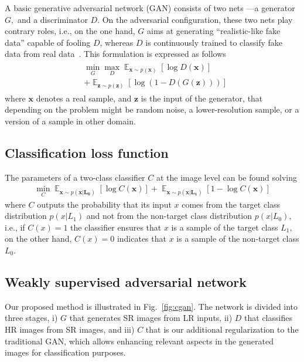 \documentclass[10pt,twocolumn,letterpaper]{article}
\DeclareMathOperator*{\E}{\mathbb{E}}
\providecommand{\ve}[1]{{\bm{#1}}} %
\begin{document}
A basic generative adversarial network (GAN) consists of two nets ---a generator $G,$ and a discriminator $D$. On the adversarial configuration, these two nets play contrary roles, i.e., on the one hand, $G$ aims at generating ``realistic-like fake data'' capable of fooling $D$, whereas $D$ is continuously trained to classify fake data from real data~\cite{Goodfellow2014}. This formulation is expressed as follows
\begin{eqnarray}
\label{eq:gan}
\begin{aligned}
& \min_G \max_D \E_{\ve{x} \sim p(\ve{x})}[\log D(\ve{x})]\\
& +\E_{\ve{z} \sim p(\ve{z})}[\log (1 - D(G(\ve{z})))]  
\end{aligned}
\end{eqnarray}
where $\ve{x}$ denotes a real sample, and $\ve{z}$ is the input of the generator, that depending on the problem might be random noise, a lower-resolution sample, or a version of a sample in other domain.

\subsection{Classification loss function}

The parameters of a two-class classifier $C$ at the image level can be found solving
\begin{eqnarray}
\label{eq:cnet}
\min_C \E_{\ve{x} \sim p(\ve{x|L_0})}[\log C(\ve{x})] +  \E_{\ve{x} \sim p(\ve{x|L_1})}[1-\log C(\ve{x})]
\end{eqnarray}
where $C$ outputs the probability that its input $x$ comes from the target class distribution $p(x|L_1)$ and not from the non-target class distribution $p(x|L_0),$ i.e., if $C(x)=1$ the classifier ensures that $x$ is a sample of the target class $L_1,$ on the other hand, $C(x)=0$ indicates that $x$ is a sample of the non-target class $L_0$.

\subsection{Weakly supervised adversarial network}

Our proposed method is illustrated in Fig.~\ref{fig:cgan}. The network is divided into three stages, i) $G$ that generates SR images from LR inputs, ii) $D$ that classifies HR images from SR images, and iii) $C$ that is our additional regularization to the traditional GAN, which allows enhancing relevant aspects in the generated images for classification purposes. 
\end{document}
